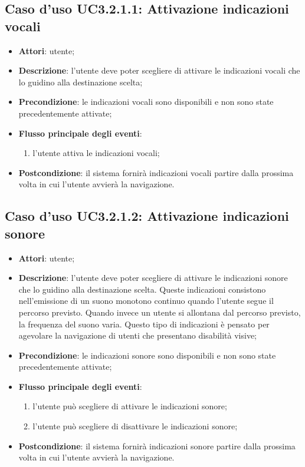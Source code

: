 \documentclass[../AnalisiDeiRequisiti.tex]{subfiles}
\begin{document}
\subsection{Caso d'uso UC3.2.1.1: Attivazione indicazioni vocali}
\begin{itemize}
\item \textbf{Attori}: utente;
\item \textbf{Descrizione}: l'utente deve poter scegliere di attivare le indicazioni vocali che lo guidino alla destinazione scelta; 
      \item \textbf{Precondizione}: le indicazioni vocali sono disponibili e non sono state precedentemente attivate;

        \item \textbf{Flusso principale degli eventi}:
          \begin{enumerate}
          \item l'utente attiva le indicazioni vocali;

      \end{enumerate}
    \item \textbf{Postcondizione}: il sistema fornirà indicazioni vocali partire dalla prossima volta in cui l'utente avvierà la navigazione.
  \end{itemize}
\hypertarget{UC3.2.1.2}{}
\subsection{Caso d'uso UC3.2.1.2: Attivazione indicazioni sonore}
\begin{itemize}
\item \textbf{Attori}: utente;
\item \textbf{Descrizione}: l'utente deve poter scegliere di attivare le indicazioni sonore che lo guidino alla destinazione scelta. Queste indicazioni consistono nell'emissione di un suono monotono continuo quando l'utente segue il percorso previsto. Quando invece un utente si allontana dal percorso previsto, la frequenza del suono varia. Questo tipo di indicazioni è pensato per agevolare la navigazione di utenti che presentano disabilità visive; 
      \item \textbf{Precondizione}: le indicazioni sonore sono disponibili e non sono state precedentemente attivate;

        \item \textbf{Flusso principale degli eventi}:
          \begin{enumerate}
          \item l'utente può scegliere di attivare le indicazioni sonore;
          \item l'utente può scegliere di disattivare le indicazioni sonore;

      \end{enumerate}
    \item \textbf{Postcondizione}: il sistema fornirà indicazioni sonore partire dalla prossima volta in cui l'utente avvierà la navigazione.
  \end{itemize}
\hypertarget{UC3.2.1.3}{}
\end{document}
